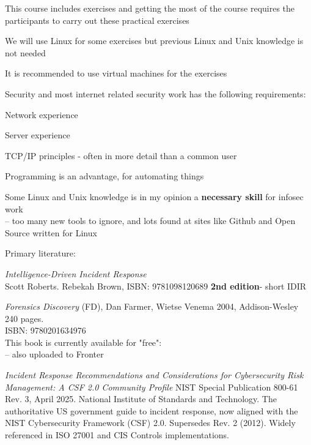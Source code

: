 \documentclass[Screen16to9,17pt]{foils}
\begin{document}

\begin{list1}
\item This course includes exercises and getting the most of the course requires the participants to carry out these practical exercises
\item We will use Linux for some exercises but previous Linux and Unix knowledge is not needed
\item It is recommended to use virtual machines for the exercises
\item Security and most internet related security work has the following requirements:
\begin{list2}
\item Network experience
\item Server experience
\item TCP/IP principles - often in more detail than a common user
\item Programming is an advantage, for automating things
\item Some Linux and Unix knowledge is in my opinion a {\bf necessary skill} for infosec work\\
-- too many new tools to ignore, and lots found at sites like Github and Open Source written for Linux
\end{list2}
\end{list1}



Primary literature:
\begin{list2}
\item \emph{Intelligence-Driven Incident Response} \\
 Scott Roberts. Rebekah Brown, ISBN: 9781098120689 {\bf 2nd edition}- short IDIR


\item \emph{Forensics Discovery} (FD), Dan Farmer, Wietse Venema 2004, Addison-Wesley 240 pages.\\
ISBN: 9780201634976\\
This book is currently available for "free":\\
 -- also uploaded to Fronter

\item \emph{
Incident Response Recommendations and Considerations for Cybersecurity Risk Management: A CSF 2.0 Community Profile} NIST Special Publication 800-61 Rev. 3, April 2025.
National Institute of Standards and Technology.
The authoritative US government guide to incident response, now aligned with the NIST Cybersecurity Framework (CSF) 2.0. Supersedes Rev. 2 (2012). Widely referenced in ISO 27001 and CIS Controls implementations.
\end{list2}
\end{document}
